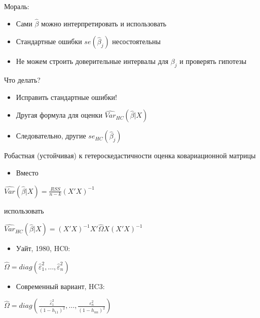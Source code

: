 \documentclass[ignorenonframetext,]{beamer}
\begin{document}
\begin{frame}{Мораль:}

\begin{itemize}
\item
  Сами \(\hat{\beta}\) можно интерпретировать и использовать
\item
  Стандартные ошибки \(se(\hat{\beta}_j)\) несостоятельны
\item
  Не можем строить доверительные интервалы для \(\beta_j\) и проверять
  гипотезы
\end{itemize}

\end{frame}

\begin{frame}{Что делать?}

\begin{itemize}
\item
  Исправить стандартные ошибки!
\item
  Другая формула для оценки \(\widehat{Var}_{HC}(\hat{\beta}|X)\)
\item
  Следовательно, другие \(se_{HC}(\hat{\beta}_j)\)
\end{itemize}

\end{frame}

\begin{frame}{Робастная (устойчивая) к гетероскедастичности оценка
ковариационной матрицы}

\begin{itemize}
\itemsep1pt\parskip0pt
\item
  Вместо
\end{itemize}

\(\widehat{Var}(\hat{\beta}|X)=\frac{RSS}{n-k}(X'X)^{-1}\)

использовать

\(\widehat{Var}_{HC}(\hat{\beta}|X)=(X'X)^{-1}X'\hat{\Omega}X(X'X)^{-1}\)

\begin{itemize}
\itemsep1pt\parskip0pt
\item
  Уайт, 1980, HC0:
\end{itemize}

\(\hat{\Omega}=diag( \hat{\varepsilon}_1^2, \ldots, \hat{\varepsilon}_n^2 )\)

\begin{itemize}
\itemsep1pt\parskip0pt
\item
  Современный вариант, HC3:
\end{itemize}

\(\hat{\Omega}=diag \left( \frac{\hat{\varepsilon}_1^2}{(1-h_{11})^2}, \ldots, \frac{\varepsilon_n^2}{(1-h_{nn})^2} \right)\)

\end{frame}
\end{document}
